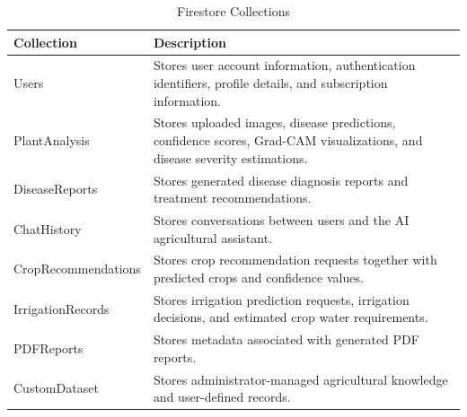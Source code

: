 \begin{table}[H]
\centering
\caption{Firestore Collections}
\label{tab:firestore_collections}
\renewcommand{\arraystretch}{1.35}

\begin{tabularx}{\textwidth}{>{\raggedright\arraybackslash}p{4cm}X}

\toprule

\textbf{Collection} &
\textbf{Description}

\\

\midrule

Users &
Stores user account information, authentication identifiers, profile details, and subscription information.

\\

PlantAnalysis &
Stores uploaded images, disease predictions, confidence scores, Grad-CAM visualizations, and disease severity estimations.

\\

DiseaseReports &
Stores generated disease diagnosis reports and treatment recommendations.

\\

ChatHistory &
Stores conversations between users and the AI agricultural assistant.

\\

CropRecommendations &
Stores crop recommendation requests together with predicted crops and confidence values.

\\

IrrigationRecords &
Stores irrigation prediction requests, irrigation decisions, and estimated crop water requirements.

\\

PDFReports &
Stores metadata associated with generated PDF reports.

\\

CustomDataset &
Stores administrator-managed agricultural knowledge and user-defined records.

\\

\bottomrule

\end{tabularx}

\end{table}

